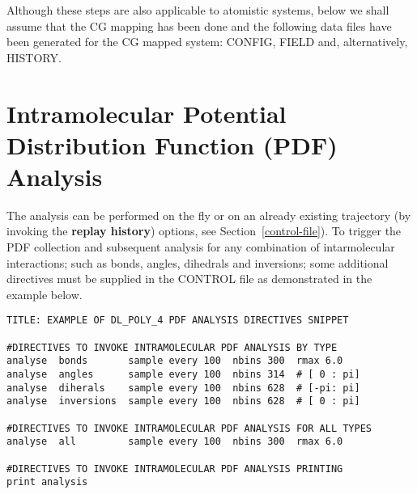  Although these steps are also
applicable to atomistic systems, below we shall assume
that the CG mapping has been done and the following data
files have been generated for the CG mapped system:
CONFIG, FIELD and, alternatively, HISTORY.

\section{Intramolecular Potential Distribution Function (PDF) Analysis}
\label{IPDF-analysis}

The analysis can be performed on the fly or on an already
existing trajectory (by invoking the {\bf replay history})
options, see Section~\ref{control-file}).
To trigger the PDF collection and subsequent analysis for
any combination of intarmolecular interactions; such as
bonds, angles, dihedrals and inversions; some additional
directives must be supplied in the CONTROL file as
demonstrated in the example below.

\begin{verbatim}
TITLE: EXAMPLE OF DL_POLY_4 PDF ANALYSIS DIRECTIVES SNIPPET

#DIRECTIVES TO INVOKE INTRAMOLECULAR PDF ANALYSIS BY TYPE
analyse  bonds       sample every 100  nbins 300  rmax 6.0
analyse  angles      sample every 100  nbins 314  # [ 0 : pi]
analyse  diherals    sample every 100  nbins 628  # [-pi: pi]
analyse  inversions  sample every 100  nbins 628  # [ 0 : pi]

#DIRECTIVES TO INVOKE INTRAMOLECULAR PDF ANALYSIS FOR ALL TYPES
analyse  all         sample every 100  nbins 300  rmax 6.0

#DIRECTIVES TO INVOKE INTRAMOLECULAR PDF ANALYSIS PRINTING
print analysis
\end{verbatim}

